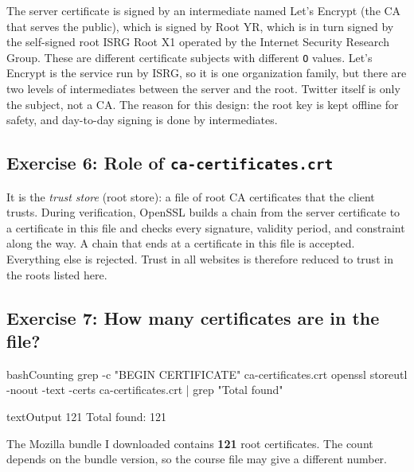             The server certificate is signed by an intermediate named Let's Encrypt (the CA that
            serves the public), which is signed by Root YR, which is in turn signed by the
            self-signed root ISRG Root X1 operated by the Internet Security Research Group.
            These are different certificate subjects with different \texttt{O} values. Let's
            Encrypt is the service run by ISRG, so it is one organization family, but there are
            two levels of intermediates between the server and the root. Twitter itself is only
            the subject, not a CA. The reason for this design: the root key is kept offline for
            safety, and day-to-day signing is done by intermediates.

        \subsection{Exercise 6: Role of \texttt{ca-certificates.crt}}

            It is the \emph{trust store} (root store): a file of root CA certificates that the
            client trusts. During verification, OpenSSL builds a chain from the server
            certificate to a certificate in this file and checks every signature, validity
            period, and constraint along the way. A chain that ends at a certificate in this
            file is accepted. Everything else is rejected. Trust in all websites is therefore
            reduced to trust in the roots listed here.

        \subsection{Exercise 7: How many certificates are in the file?}

            \begin{codeblock}[]{bash}{Counting}
                grep -c "BEGIN CERTIFICATE" ca-certificates.crt
                openssl storeutl -noout -text -certs ca-certificates.crt | grep "Total found"
            \end{codeblock}

            \begin{codeblock}[]{text}{Output}
                121
                Total found: 121
            \end{codeblock}

            The Mozilla bundle I downloaded contains \textbf{121} root certificates. The count
            depends on the bundle version, so the course file may give a different number.

